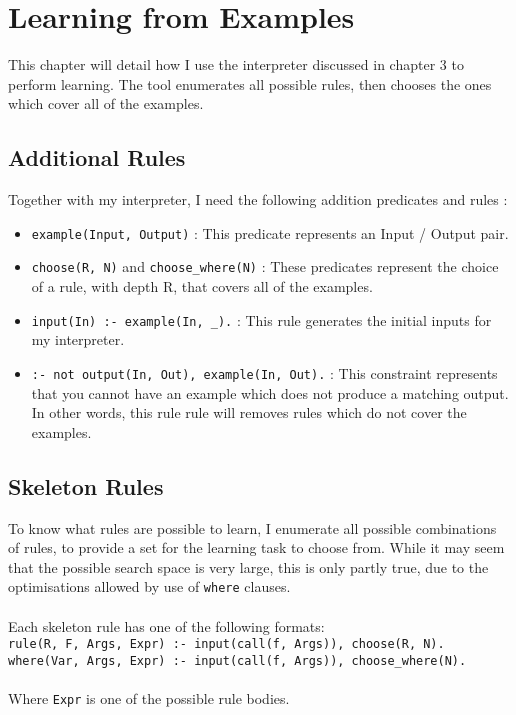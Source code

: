 \chapter{Learning from Examples}

This chapter will detail how I use the interpreter discussed in chapter 3 to perform learning. The tool enumerates all possible rules, then chooses the ones which cover all of the examples.

\section{Additional Rules}
Together with my interpreter, I need the following addition predicates and rules :
\begin{itemize}
\item \lstinline{example(Input, Output)} : This predicate represents an Input / Output pair.
\item \lstinline{choose(R, N)} and \lstinline{choose_where(N)} : These predicates represent the choice of a rule, with depth R, that covers all of the examples.
\item \lstinline{input(In) :- example(In, _).} : This rule generates the initial inputs for my interpreter.
\item \lstinline{:- not output(In, Out), example(In, Out).}  : This constraint represents that you cannot have an example which does not produce a matching output. In other words, this rule rule will removes rules which do not cover the examples.
\end{itemize}

\section{Skeleton Rules}
To know what rules are possible to learn, I enumerate all possible combinations of rules, to provide a set for the learning task to choose from. While it may seem that the possible search space is very large, this is only partly true, due to the optimisations allowed by use of \lstinline{where} clauses. \\ \\ %
Each skeleton rule has one of the following formats: \\

\lstinline{rule(R, F, Args, Expr) :- input(call(f, Args)), choose(R, N).} %
\mbox{} \\

\lstinline{where(Var, Args, Expr) :- input(call(f, Args)), choose_where(N).} %
\mbox{} \\ \\
Where \lstinline{Expr} is one of the possible rule bodies. %

